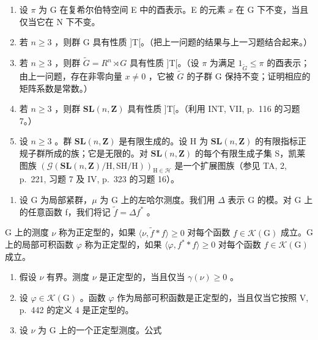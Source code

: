 \begin{enumerate}
\def\labelenumi{\alph{enumi})}
\item
  设 \(\pi\) 为 G 在复希尔伯特空间 E 中的酉表示。E 的元素 \(x\) 在 G 下不变，当且仅当它在 N 下不变。
\item
  若 \(n \geqslant 3\) ，则群 G 具有性质 ]T[。（把上一问题的结果与上一习题结合起来。）
\item
  若 \(n \geqslant 3\) ，则群 \(\widetilde{G} = R^{n} \rtimes G\) 具有性质 ]T[。（设 \(\pi\) 为满足 \(1_{\widetilde{G}} \leqslant \pi\) 的酉表示；由上一问题，存在非零向量 \(x \neq 0\) ，它被 \(\widetilde{G}\) 的子群 G 保持不变；证明相应的矩阵系数是常数。）
\item
  若 \(n \geqslant 3\) ，则群 \(\mathbf{SL}(n, \mathbf{Z})\) 具有性质 ]T[。（利用 INT, VII, p.~116 的习题 7。）
\item
  设 \(n \geqslant 3\) 。群 \(\mathbf{SL}(n, \mathbf{Z})\) 是有限生成的。设 H 为 \(\mathbf{SL}(n, \mathbf{Z})\) 的有限指标正规子群所成的族；它是无限的。对 \(\mathbf{SL}(n, \mathbf{Z})\) 的每个有限生成子集 S，凯莱图族 \((\mathcal{G}(\mathbf{SL}(n, \mathbf{Z})/\mathrm{H}, \mathrm{SH}/\mathrm{H}))_{\mathrm{H} \in \mathcal{H}}\) 是一个扩展图族（参见 TA, 2, p.~221, 习题 7 及 IV, p.~323 的习题 16）。
\end{enumerate}

\begin{enumerate}
\def\labelenumi{\arabic{enumi})}
\setcounter{enumi}{19}
\tightlist
\item
  设 G 为局部紧群，\(\mu\) 为 G 上的左哈尔测度。我们用 \(\Delta\) 表示 G 的模。对 G 上的任意函数 f，我们将记 \(\widetilde{f} = \Delta f^{*}\) 。
\end{enumerate}

G 上的测度 \(\nu\) 称为正定型的，如果 \(\langle \nu, \tilde{f} * f \rangle \geqslant 0\) 对每个函数 \(f \in \mathcal{K}(\mathrm{G})\) 成立。G 上的局部可积函数 \(\varphi\) 称为正定型的，如果 \(\langle \varphi, f^* * f \rangle \geqslant 0\) 对每个函数 \(f \in \mathcal{K}(\mathrm{G})\) 成立。

\begin{enumerate}
\def\labelenumi{\alph{enumi})}
\item
  假设 \(\nu\) 有界。测度 \(\nu\) 是正定型的，当且仅当 \(\gamma(\nu) \geqslant 0\) 。
\item
  设 \(\varphi\in\mathcal{K}(\mathrm{G})\) 。函数 \(\varphi\) 作为局部可积函数是正定型的，当且仅当它按照 V, p.~442 的定义 4 是正定型的。
\item
  设 \(\nu\) 为 G 上的一个正定型测度。公式
\end{enumerate}

